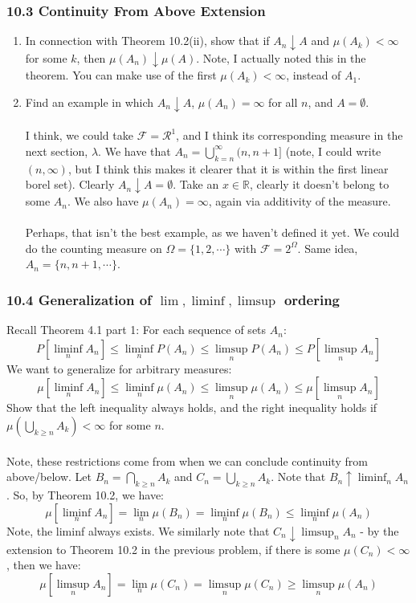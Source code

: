 \documentclass[12pt,a4paper]{article}
\newcommand{\1}[1]{\mathbbm{1}\left\{ #1 \right\}}
\newcommand{\R}{\mathbb{R}}
\newcommand{\fcal}{\mathcal{F}}
\newcommand{\rcal}{\mathcal{R}}
\begin{document}
\subsubsection{10.3 Continuity From Above Extension}
\begin{enumerate}
	\item In connection with Theorem 10.2(ii), show that if $A_n \downarrow A$ and $\mu(A_k) < \infty$ for some $k$, then $\mu(A_n) \downarrow \mu(A)$. Note, I actually noted this in the theorem. You can make use of the first $\mu(A_k) < \infty$, instead of $A_1$.
	
	\item Find an example in which $A_n \downarrow A$, $\mu(A_n) = \infty$ for all $n$, and $A = \emptyset$.
	\\\\
	I think, we could take $\fcal = \rcal^1$, and I think its corresponding measure in the next section, $\lambda$. We have that $A_n = \bigcup_{k = n}^\infty (n, n+1]$ (note, I could write $(n, \infty)$, but I think this makes it clearer that it is within the first linear borel set). Clearly $A_n \downarrow A = \emptyset$. Take an $x \in \R$, clearly it doesn't belong to some $A_n$. We also have $\mu(A_n) = \infty$, again via additivity of the measure.
	\\\\
	Perhaps, that isn't the best example, as we haven't defined it yet. We could do the counting measure on $\Omega = \{1, 2, \cdots\}$ with $\fcal = 2^\Omega$. Same idea, $A_n = \{n, n + 1, \cdots\}$. 
\end{enumerate}

\subsubsection{10.4 Generalization of $\lim, \liminf, \limsup$ ordering} Recall Theorem 4.1 part 1: For each sequence of sets $A_n$:
$$
	P\left[\liminf_n A_n\right] \leq \liminf_n P(A_n) \leq \limsup_n P(A_n) \leq
	P\left[\limsup_n A_n\right]
$$
We want to generalize for arbitrary measures:
$$
	\mu\left[\liminf_n A_n\right] \leq \liminf_n \mu(A_n) \leq \limsup_n \mu(A_n) \leq
	\mu\left[\limsup_n A_n\right]
$$
Show that the left inequality always holds, and the right inequality holds if $\mu\left(\bigcup_{k \geq n} A_k\right) < \infty$ for some $n$.
\\\\
Note, these restrictions come from when we can conclude continuity from above/below. Let $B_n = \bigcap_{k \geq n} A_k$ and $C_n = \bigcup_{k \geq n} A_k$. Note that $B_n \uparrow \liminf_n A_n$. So, by Theorem 10.2, we have:
$$
	\mu\left[\liminf_n A_n\right] = \lim_n \mu(B_n) = \liminf_n \mu(B_n) \leq
	\liminf_n \mu(A_n)
$$
Note, the liminf always exists. We similarly note that $C_n \downarrow \limsup_n A_n$ - by the extension to Theorem 10.2 in the previous problem, if there is some $\mu(C_n) < \infty$, then we have:
$$
	\mu\left[\limsup_n A_n\right] = \lim_n \mu(C_n) = \limsup_n \mu(C_n) \geq \limsup_n \mu(A_n)
$$
\end{document}
